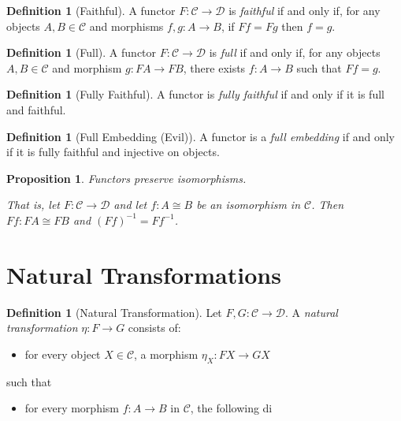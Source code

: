\documentclass{book}
\newtheorem{proposition}[lemma]{Proposition}
\theoremstyle{definition}
\newtheorem{definition}[lemma]{Definition}
\newcommand{\CC}{\ensuremath{\mathcal{C}}}
\newcommand{\DD}{\ensuremath{\mathcal{D}}}
\newcommand{\inv}[1]{\ensuremath{{#1}^{-1}}}
\begin{document}
\begin{definition}[Faithful]
    A functor $F : \CC \rightarrow \DD$ is \emph{faithful} if and only if, for any objects $A, B \in \CC$ and morphisms $f, g : A \rightarrow B$,
    if $Ff = Fg$ then $f = g$.
\end{definition}

\begin{definition}[Full]
    A functor $F : \CC \rightarrow \DD$ is \emph{full} if and only if, for any objects $A, B \in \CC$ and morphism $g : FA \rightarrow FB$,
    there exists $f : A \rightarrow B$ such that $Ff = g$.
\end{definition}

\begin{definition}[Fully Faithful]
    A functor is \emph{fully faithful} if and only if it is full and faithful.
\end{definition}

\begin{definition}[Full Embedding (Evil)]
    A functor is a \emph{full embedding} if and only if it is fully faithful and injective on objects.
\end{definition}

\begin{proposition}
    Functors preserve isomorphisms.

    That is, let $F : \CC \rightarrow \DD$ and let $f : A \cong B$ be an isomorphism in $\CC$. Then $Ff : FA \cong FB$ and
    $\inv{(Ff)} = F \inv{f}$.
\end{proposition}

\section{Natural Transformations}

\begin{definition}[Natural Transformation]
    Let $F, G : \CC \rightarrow \DD$. A \emph{natural transformation} $\eta : F \rightarrow G$ consists of:
    \begin{itemize}
        \item for every object $X \in \CC$, a morphism $\eta_X : FX \rightarrow GX$
    \end{itemize}
    such that
    \begin{itemize}
        \item for every morphism $f : A \rightarrow B$ in $\CC$, the following di
    \end{itemize}
\end{definition}
\end{document}
